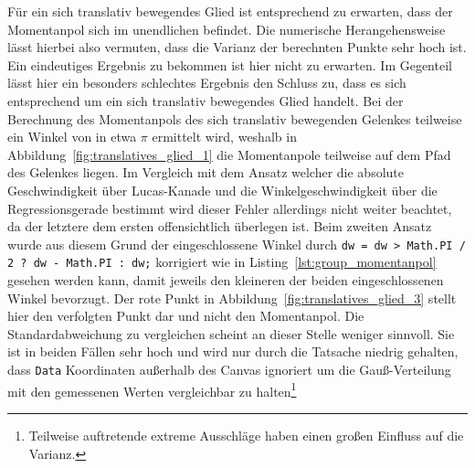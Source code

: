 Für ein sich translativ bewegendes Glied ist entsprechend zu erwarten, dass der Momentanpol sich im unendlichen befindet.
Die numerische Herangehensweise lässt hierbei also vermuten, dass die Varianz der berechnten Punkte sehr hoch ist.
Ein eindeutiges Ergebnis zu bekommen ist hier nicht zu erwarten.
Im Gegenteil lässt hier ein besonders schlechtes Ergebnis den Schluss zu, dass es sich entsprechend um ein sich translativ bewegendes Glied handelt.
Bei der Berechnung des Momentanpols des sich translativ bewegenden Gelenkes teilweise ein Winkel von in etwa $\pi$ ermittelt wird, weshalb in Abbildung~\ref{fig:translatives_glied_1} die Momentanpole teilweise auf dem Pfad des Gelenkes liegen.
Im Vergleich mit dem Ansatz welcher die absolute Geschwindigkeit über Lucas-Kanade und die Winkelgeschwindigkeit über die Regressionsgerade bestimmt wird dieser Fehler allerdings nicht weiter beachtet, da der letztere dem ersten offensichtlich überlegen ist.
Beim zweiten Ansatz wurde aus diesem Grund der eingeschlossene Winkel durch \lstinline{dw = dw > Math.PI / 2 ? dw - Math.PI : dw;} korrigiert wie in Listing~\ref{lst:group_momentanpol} gesehen werden kann, damit jeweils den kleineren der beiden eingeschlossenen Winkel bevorzugt.
Der rote Punkt in Abbildung~\ref{fig:translatives_glied_3} stellt hier den verfolgten Punkt dar und nicht den Momentanpol.
Die Standardabweichung zu vergleichen scheint an dieser Stelle weniger sinnvoll.
Sie ist in beiden Fällen sehr hoch und wird nur durch die Tatsache niedrig gehalten, dass \lstinline{Data} Koordinaten außerhalb des Canvas ignoriert um die Gauß-Verteilung mit den gemessenen Werten vergleichbar zu halten\footnote{Teilweise auftretende extreme Ausschläge haben einen großen Einfluss auf die Varianz.}

